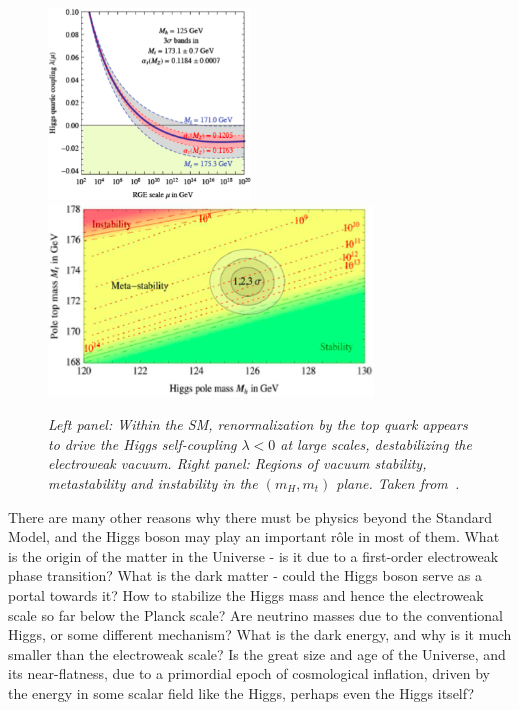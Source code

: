 \documentclass[12pt]{article}
\numberwithin{equation}{section}
\begin{document}
\begin{figure}[tb]
\centering
\includegraphics[height=2in]{Buttazzo1.png}
\hspace{0.5cm}
\includegraphics[height=2in]{Buttazzo2.png}
\caption{\it Left panel: Within the SM, renormalization by the top quark appears to drive the Higgs self-coupling $\lambda < 0$ at
large scales, destabilizing the electroweak vacuum. Right panel: Regions of vacuum stability, metastability and instability in the $(m_H, m_t)$ plane.
Taken from~\protect\cite{Buttazzo}.}
\label{fig:Buttazzo}
\end{figure}

There are many other reasons why there must be physics beyond the Standard Model, and the Higgs boson
may play an important r\^ole in most of them. What is the origin of the matter in the Universe - is it due to
a first-order electroweak phase transition? What is the dark matter - could the Higgs boson serve as a portal
towards it? How to stabilize the Higgs mass and hence the electroweak scale so far below the Planck scale?
Are neutrino masses due to the conventional Higgs, or some different mechanism? What is the dark energy, and why
is it much smaller than the electroweak scale? Is the great size and age of the Universe, and its near-flatness, due
to a primordial epoch of cosmological inflation, driven by the energy in some scalar field like the Higgs, perhaps
even the Higgs itself?
\end{document}
